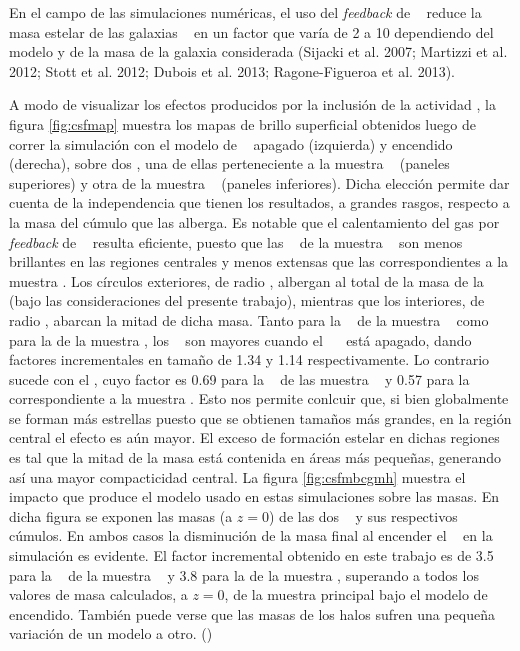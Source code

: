 
En el campo de las simulaciones num\'ericas, el uso del {\it feedback} de \agn~ reduce la masa estelar de las galaxias \bcgs~
en un factor que var\'ia de 2 a 10 dependiendo del modelo y de la masa de la galaxia considerada (Sijacki et al. 2007; Martizzi 
et al. 2012; Stott et al. 2012; Dubois et al. 2013; Ragone-Figueroa et al. 2013).

A modo de visualizar los efectos producidos por la inclusi\'on de la actividad \agn,
la figura \ref{fig:csfmap} muestra los mapas de brillo superficial obtenidos luego de
correr la simulaci\'on con el modelo
de \agn~ apagado (izquierda)
y encendido (derecha), sobre dos \bcgs, una de ellas
perteneciente a la muestra \cmay~ (paneles superiores) y otra de la muestra \cmen~ 
(paneles inferiores).
Dicha elecci\'on permite dar cuenta de la independencia que tienen los resultados, a grandes rasgos, 
respecto a la masa del c\'umulo que las alberga.  
Es notable que el calentamiento del gas por \textit{feedback} de \agn~ resulta eficiente, 
puesto que las
\bcgs~ de la muestra \agnon~ son menos brillantes en las regiones centrales y menos 
extensas que las correspondientes a la muestra \agnoff.
Los c\'irculos exteriores, de radio \rvc, albergan
al total de la masa de la \bcg~ (bajo las consideraciones del presente trabajo),
mientras que los interiores, de radio \rum, abarcan
la mitad de dicha masa.
Tanto para la \bcg~ de la muestra \cmay~ como para la de la muestra \cmen,
los \rvc~ son mayores cuando el ~\agn~ est\'a apagado, dando factores incrementales 
en tama\~no de 1.34 y 1.14 respectivamente.
Lo contrario sucede con el \rum, cuyo factor es 0.69 para la \bcg~ de
las muestra \cmay~ y 0.57 para la correspondiente a la muestra \cmen. Esto nos permite conlcuir que,
si bien globalmente se forman m\'as estrellas puesto que se obtienen tama\~nos
m\'as grandes, en la regi\'on central el efecto es a\'un mayor. El exceso de formaci\'on 
estelar en dichas regiones es tal
que la mitad de la masa est\'a contenida en \'areas m\'as peque\~nas, generando as\'i 
una mayor compacticidad central.
La figura \ref{fig:csfmbcgmh} muestra el impacto que produce el modelo usado en estas 
simulaciones sobre las masas. 
En dicha figura se exponen las masas (a $z=0$) de las dos \bcgs~ y sus respectivos c\'umulos. 
En ambos casos la disminuci\'on de la masa final al encender el \agn~ en la simulaci\'on es evidente. El factor
incremental obtenido en este trabajo es de 3.5 para la \bcg~ de la muestra \cmay~ y 3.8
para la de la muestra \cmen, superando
a todos los valores de masa calculados, a $z=0$, de la muestra principal bajo el modelo 
de \agn~ encendido.
Tambi\'en puede verse que las masas de los halos sufren una peque\~na variaci\'on de 
un modelo a otro. ()

